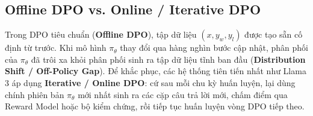 \subsection{Offline DPO vs. Online / Iterative DPO \citep{xiong2024iterative}}
Trong DPO tiêu chuẩn (\textbf{Offline DPO}), tập dữ liệu $(x, y_w, y_l)$ được tạo sẵn cố định từ trước. Khi mô hình $\pi_\theta$ thay đổi qua hàng nghìn bước cập nhật, phân phối của $\pi_\theta$ đã trôi xa khỏi phân phối sinh ra tập dữ liệu tĩnh ban đầu (\textbf{Distribution Shift / Off-Policy Gap}).
Để khắc phục, các hệ thống tiên tiến nhất như Llama 3 \citep{dubey2024llama} áp dụng \textbf{Iterative / Online DPO}: cứ sau mỗi chu kỳ huấn luyện, lại dùng chính phiên bản $\pi_\theta$ mới nhất sinh ra các cặp câu trả lời mới, chấm điểm qua Reward Model hoặc bộ kiểm chứng, rồi tiếp tục huấn luyện vòng DPO tiếp theo.
